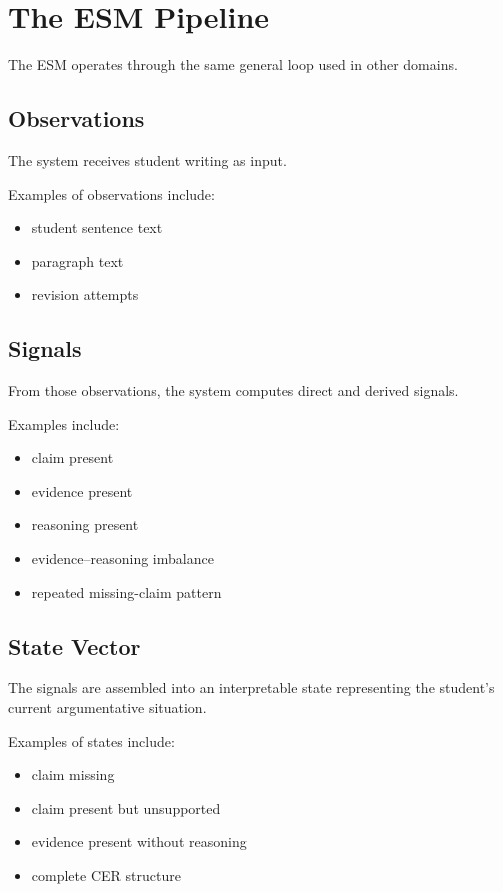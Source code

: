 \documentclass[11pt]{article}
\begin{document}
\section{The ESM Pipeline}

The ESM operates through the same general loop used in other domains.

\subsection*{Observations}

The system receives student writing as input.

Examples of observations include:

\begin{itemize}
\item student sentence text
\item paragraph text
\item revision attempts
\end{itemize}

\subsection*{Signals}

From those observations, the system computes direct and derived signals.

Examples include:

\begin{itemize}
\item claim present
\item evidence present
\item reasoning present
\item evidence--reasoning imbalance
\item repeated missing-claim pattern
\end{itemize}

\subsection*{State Vector}

The signals are assembled into an interpretable state representing the student's current argumentative situation.

Examples of states include:

\begin{itemize}
\item claim missing
\item claim present but unsupported
\item evidence present without reasoning
\item complete CER structure
\end{itemize}
\end{document}

